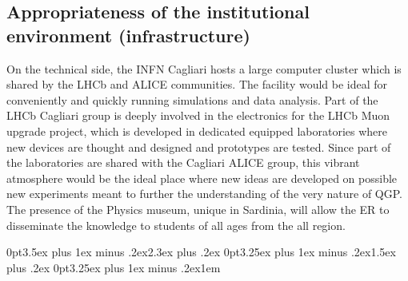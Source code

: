 \documentclass[a4paper,11pt]{article}
\newcommand{\ER}{ER\xspace}
\newcommand{\supervisor}{the supervisor\xspace}
\begin{document}
%      
%      
\subsection{Appropriateness of the institutional environment (infrastructure)}



On the technical side, the INFN Cagliari hosts a large computer cluster which
is shared by the LHCb and ALICE communities. The facility would be
ideal for conveniently and quickly running simulations and data analysis. 
Part of the LHCb Cagliari group is deeply involved in the 
electronics for the LHCb Muon upgrade project, which is 
developed in dedicated equipped laboratories where new devices 
are thought and designed and prototypes are tested. 
Since part of the laboratories are shared with the Cagliari ALICE group,
this vibrant atmosphere would be the ideal place where 
new ideas are developed on possible new experiments 
meant to further the understanding of the very nature of 
QGP. The presence of the Physics museum, unique in Sardinia, 
will allow the \ER to disseminate the knowledge to 
students of all ages from the all region.
\clearpage

\titlespacing*{\section} {0pt}{3.5ex plus 1ex minus .2ex}{2.3ex plus .2ex}
\titlespacing*{\subsection} {0pt}{3.25ex plus 1ex minus .2ex}{1.5ex plus .2ex}
\titlespacing*{\paragraph} {0pt}{3.25ex plus 1ex minus .2ex}{1em}
\end{document}
